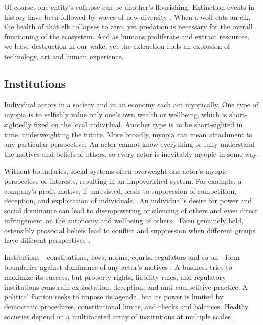 \documentclass[11pt]{article}
\begin{document}
Of course, one entity's collapse can be another's flourishing. Extinction events in history have been followed by waves of new diversity \citep{feng2017phylogenomics, jablonski2005mass, raup1994role}. When a wolf eats an elk, the health of that elk collapses to zero, yet predation is necessary for the overall functioning of the ecosystem. And as humans proliferate and extract resources, we leave destruction in our wake; yet the extraction fuels an explosion of technology, art and human experience.

\subsection{Institutions}


Individual actors in a society and in an economy each act myopically. One type of myopia is to selfishly value only one's own wealth or wellbeing, which is short-sightedly fixed on the local individual. Another type is to be short-sighted in time, underweighting the future. More broadly, myopia can mean attachment to any particular perspective. An actor cannot know everything or fully understand the motives and beliefs of others, so every actor is inevitably myopic in some way. 


Without boundaries, social systems often overweight one actor's myopic perspective or interests, resulting in an impoverished system. For example, a company's profit motive, if unresisted, leads to suppression of competition, deception, and exploitation of individuals \citep{dalrymple2019anarchy, baran1966monopoly, goldacre2014bad, smith1776inquiry, bakan2006corporation}. An individual's desire for power and social dominance can lead to disempowering or silencing of others and even direct infringement on the autonomy and wellbeing of others \citep{hawley2003prosocial, tepper2000consequences, sidanius2001social}. Even genuinely held, ostensibly prosocial beliefs lead to conflict and suppression when different groups have different perspectives \citep{haidt2012righteous, scott1998seeing, greene2013moral}.

Institutions---constitutions, laws, norms, courts, regulators and so on---form boundaries against dominance of any actor's motives \citep{north1990institutions}. A business tries to maximize its success, but property rights, liability rules, and regulatory institutions constrain exploitation, deception, and anti-competitive practice. A political faction seeks to impose its agenda, but its power is limited by democratic procedures, constitutional limits, and checks and balances. Healthy societies depend on a multifaceted array of institutions at multiple scales \citep{ostrom1990governing, leibo2025societal}.
\end{document}
